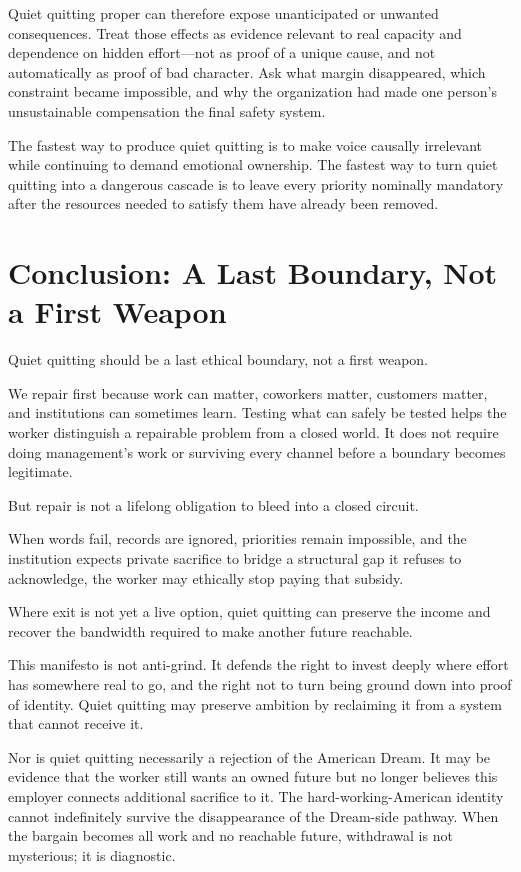 \documentclass[11pt,oneside]{article}
\begin{document}
Quiet quitting proper can therefore expose unanticipated or unwanted
consequences. Treat those effects as evidence relevant to real capacity
and dependence on hidden effort---not as proof of a unique cause, and
not automatically as proof of bad character. Ask what margin
disappeared, which constraint became impossible, and why the
organization had made one person's unsustainable compensation the final
safety system.

The fastest way to produce quiet quitting is to make voice causally
irrelevant while continuing to demand emotional ownership. The fastest
way to turn quiet quitting into a dangerous cascade is to leave every
priority nominally mandatory after the resources needed to satisfy them
have already been removed.

\hypertarget{conclusion-a-last-boundary-not-a-first-weapon}{%
\section{Conclusion: A Last Boundary, Not a First
Weapon}\label{conclusion-a-last-boundary-not-a-first-weapon}}

Quiet quitting should be a last ethical boundary, not a first weapon.

We repair first because work can matter, coworkers matter, customers
matter, and institutions can sometimes learn. Testing what can safely be
tested helps the worker distinguish a repairable problem from a closed
world. It does not require doing management's work or surviving every
channel before a boundary becomes legitimate.

But repair is not a lifelong obligation to bleed into a closed circuit.

When words fail, records are ignored, priorities remain impossible, and
the institution expects private sacrifice to bridge a structural gap it
refuses to acknowledge, the worker may ethically stop paying that
subsidy.

Where exit is not yet a live option, quiet quitting can preserve the
income and recover the bandwidth required to make another future
reachable.

This manifesto is not anti-grind. It defends the right to invest deeply
where effort has somewhere real to go, and the right not to turn being
ground down into proof of identity. Quiet quitting may preserve ambition
by reclaiming it from a system that cannot receive it.

Nor is quiet quitting necessarily a rejection of the American Dream. It
may be evidence that the worker still wants an owned future but no
longer believes this employer connects additional sacrifice to it. The
hard-working-American identity cannot indefinitely survive the
disappearance of the Dream-side pathway. When the bargain becomes all
work and no reachable future, withdrawal is not mysterious; it is
diagnostic.
\end{document}
